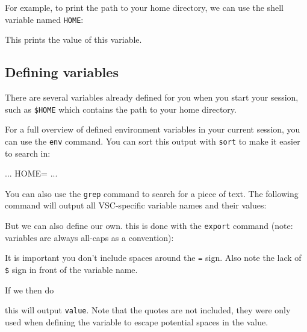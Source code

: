 For example, to print the path to your home directory, we can use the shell variable named \lstinline|HOME|:

\begin{prompt}
\end{prompt}

This prints the value of this variable.

\subsection{Defining variables}

There are several variables already defined for you when you start your
session, such as \lstinline|$HOME| which contains the path to your home directory.

For a full overview of defined environment variables in your current session,
you can use the \lstinline|env| command. You can sort this output with \lstinline|sort|
to make it easier to search in:

\begin{prompt}
...
HOME=%
...
\end{prompt}

You can also use the \lstinline|grep| command to search for a piece of text. The
following command will output all VSC-specific variable names and their values:

\begin{prompt}
\end{prompt}

But we can also define our own. this is done with the \lstinline|export| command (note:
variables are always all-caps as a convention):

\begin{prompt}
\end{prompt}

It is important you don't include spaces around the \lstinline|=| sign. Also note
the lack of \lstinline|$| sign in front of the variable name.

If we then do

\begin{prompt}
\end{prompt}

this will output \lstinline|value|. Note that the quotes are not included, they were
only used when defining the variable to escape potential spaces in the value.

